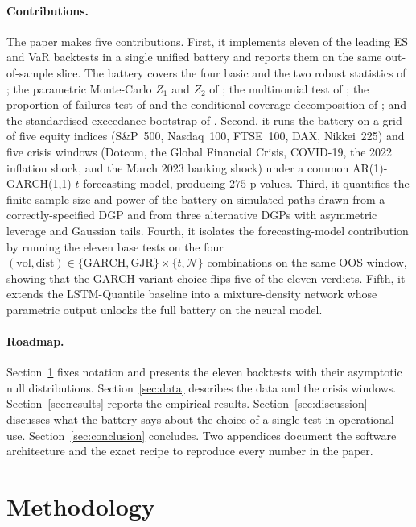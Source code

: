 \documentclass[11pt,a4paper]{article}
\theoremstyle{plain}
\begin{document}
\paragraph{Contributions.} The paper makes five contributions. First,
it implements eleven of the leading ES and VaR backtests in a single
unified battery and reports them on the same out-of-sample slice. The
battery covers the four basic and the two robust statistics of
\citet{du_escanciano_2017}; the parametric Monte-Carlo $Z_1$ and $Z_2$
of \citet{acerbi_szekely_2014}; the multinomial test of
\citet{kratz_lok_mcneil_2018}; the proportion-of-failures test of
\citet{kupiec_1995} and the conditional-coverage decomposition of
\citet{christoffersen_1998}; and the standardised-exceedance bootstrap
of \citet{mcneil_frey_2000}. Second, it runs the battery on a grid of
five equity indices (S\&P~500, Nasdaq~100, FTSE~100, DAX, Nikkei~225)
and five crisis windows (Dotcom, the Global Financial Crisis,
COVID-19, the 2022 inflation shock, and the March 2023 banking shock)
under a common AR(1)-GARCH(1,1)-$t$ forecasting model, producing $275$
p-values. Third, it quantifies the finite-sample size and power of
the battery on simulated paths drawn from a correctly-specified DGP
and from three alternative DGPs with asymmetric leverage and Gaussian
tails. Fourth, it isolates the forecasting-model contribution by
running the eleven base tests on the four
$(\text{vol},\text{dist}) \in \{\text{GARCH},\text{GJR}\} \times
\{t, \mathcal{N}\}$ combinations on the same OOS window, showing
that the GARCH-variant choice flips five of the eleven verdicts.
Fifth, it extends the LSTM-Quantile baseline into a mixture-density
network whose parametric output unlocks the full battery on the
neural model.

\paragraph{Roadmap.} Section~\ref{sec:method} fixes notation and
presents the eleven backtests with their asymptotic null distributions.
Section~\ref{sec:data} describes the data and the crisis windows.
Section~\ref{sec:results} reports the empirical results.
Section~\ref{sec:discussion} discusses what the battery says about the
choice of a single test in operational use. Section~\ref{sec:conclusion}
concludes. Two appendices document the software architecture and the
exact recipe to reproduce every number in the paper.

\section{Methodology}
\label{sec:method}
\end{document}
